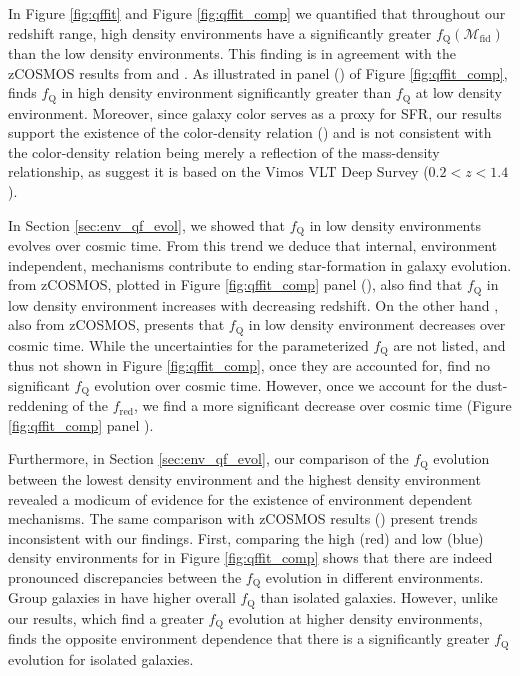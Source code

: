 \documentclass{aastex}
\begin{document}
In Figure \ref{fig:qffit} and Figure \ref{fig:qffit_comp} we
quantified that throughout our redshift range, high density
environments have a significantly greater
$f_{\mathrm{Q}}(\mathcal{M}_{\mathrm{fid}})$ than the low density
environments. This finding is in agreement with the zCOSMOS results
from \cite{Cucciati:2010aa} and \cite{Kovac:2014aa}. As illustrated in
panel (\kovacpanel) of Figure \ref{fig:qffit_comp}, \cite{Kovac:2014aa} finds $f_{\mathrm{Q}}$ in high density environment
significantly greater than $f_{\mathrm{Q}}$ at low density
environment. Moreover, since galaxy color serves as a proxy for SFR,
our results support the existence of the color-density relation
(\citealt{Cucciati:2010aa, Cooper:2010aa}) and is not consistent with
the color-density relation being merely a reflection of the
mass-density relationship, as \cite{Scodeggio:2009aa} suggest it is
based on the Vimos VLT Deep Survey ($0.2 < z< 1.4$).


In Section \ref{sec:env_qf_evol}, we showed that $f_{\mathrm{Q}}$ in
low density environments evolves over cosmic time. From this trend we
deduce that internal, environment independent, mechanisms contribute
to ending star-formation in galaxy evolution. \cite{Iovino:2010aa}
from zCOSMOS, plotted in Figure \ref{fig:qffit_comp}  panel (\iovinopanel), also find that
$f_{\mathrm{Q}}$ in low density environment increases with decreasing redshift. On the other hand \cite{Kovac:2014aa}, also from zCOSMOS, presents that $f_{\mathrm{Q}}$ in low density environment decreases over cosmic time. While the uncertainties for the parameterized $f_{\mathrm{Q}}$ are not listed, and thus not shown in Figure \ref{fig:qffit_comp}, once they are accounted for, \cite{Kovac:2014aa} find no significant $f_{\mathrm{Q}}$ evolution over cosmic time. However, once we account for the dust-reddening of the $f_{\mathrm{red}}$, we find a more significant decrease over cosmic time (Figure \ref{fig:qffit_comp} panel \kovacpanel).

Furthermore, in Section \ref{sec:env_qf_evol}, our comparison of the
$f_{\mathrm{Q}}$ evolution between the lowest density environment and the
highest density environment revealed a modicum of evidence for the
existence of environment dependent mechanisms. The same comparison
with zCOSMOS results (\citealt{Iovino:2010aa, Kovac:2014aa}) present
trends inconsistent with our findings. First, comparing the high (red)
and low (blue) density environments for \cite{Iovino:2010aa} in Figure
\ref{fig:qffit_comp} shows that there are indeed pronounced
discrepancies between the $f_{\mathrm{Q}}$ evolution in different
environments. Group galaxies in \cite{Iovino:2010aa} have higher
overall $f_{\mathrm{Q}}$ than isolated galaxies. However, unlike our
results, which find a greater $f_{\mathrm{Q}}$ evolution at higher density
environments, \cite{Iovino:2010aa} finds the opposite environment
dependence that there is a significantly greater $f_{\mathrm{Q}}$
evolution for isolated galaxies.
\end{document}
